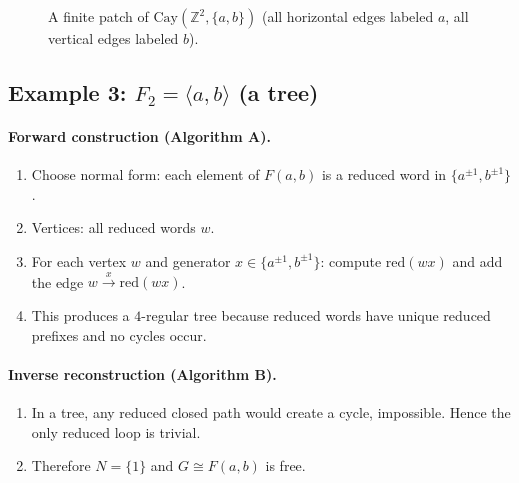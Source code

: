 \documentclass[11pt]{article}
\theoremstyle{definition}
\theoremstyle{plain}
\theoremstyle{remark}
\newcommand{\Cay}{\mathrm{Cay}}
\begin{document}
\begin{figure}[h]
\centering
{}
\caption{A finite patch of $\Cay(\mathbb Z^2,\{a,b\})$ (all horizontal edges labeled $a$, all vertical edges labeled $b$).}
\end{figure}

\subsection*{Example 3: $F_2=\langle a,b\rangle$ (a tree)}
\paragraph{Forward construction (Algorithm A).}
\begin{enumerate}[leftmargin=2.2em]
\item Choose normal form: each element of $F(a,b)$ is a reduced word in $\{a^{\pm1},b^{\pm1}\}$.
\item Vertices: all reduced words $w$.
\item For each vertex $w$ and generator $x\in\{a^{\pm1},b^{\pm1}\}$:
compute $\mathrm{red}(wx)$ and add the edge $w\xrightarrow{x}\mathrm{red}(wx)$.
\item This produces a $4$-regular tree because reduced words have unique reduced prefixes and no cycles occur.
\end{enumerate}

\paragraph{Inverse reconstruction (Algorithm B).}
\begin{enumerate}[leftmargin=2.2em]
\item In a tree, any reduced closed path would create a cycle, impossible. Hence the only reduced loop is trivial.
\item Therefore $N=\{1\}$ and $G\cong F(a,b)$ is free.
\end{enumerate}
\end{document}
